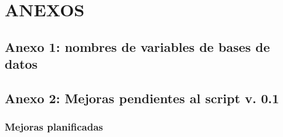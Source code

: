 \documentclass[
  spanish,
]{book}
\begin{document}
\hypertarget{part-anexos}{%
\part*{ANEXOS}\label{part-anexos}}

\hypertarget{anexo-1-nombres-de-variables-de-bases-de-datos}{%
\chapter*{Anexo 1: nombres de variables de bases de datos}\label{anexo-1-nombres-de-variables-de-bases-de-datos}}

\hypertarget{anexo-2-mejoras-pendientes-al-script-v.-0.1}{%
\chapter*{Anexo 2: Mejoras pendientes al script v. 0.1}\label{anexo-2-mejoras-pendientes-al-script-v.-0.1}}

\hypertarget{mejoras-planificadas}{%
\section*{Mejoras planificadas}\label{mejoras-planificadas}}
\end{document}
